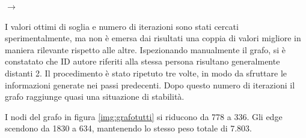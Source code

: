 \documentclass[12pt,a4paper,twoside]{report}
\begin{document}
\begin{center}
\begin{minipage}{0.40\textwidth}
\end{minipage}
\begin{minipage}{0.075\textwidth}
$\rightarrow$
\end{minipage}
\begin{minipage}{0.40\textwidth}
\end{minipage}
\end{center}

I valori ottimi di soglia e numero di iterazioni sono stati cercati sperimentalmente, ma non è
emersa dai risultati una coppia di valori migliore in maniera rilevante rispetto alle altre.
Ispezionando manualmente il grafo, si è constatato che ID autore riferiti alla stessa persona
risultano generalmente distanti 2. Il procedimento è stato ripetuto tre volte, in modo da sfruttare
le informazioni generate nei passi predecenti. Dopo questo numero di iterazioni il grafo raggiunge
quasi una situazione di stabilità.

\clearpage %

I nodi del grafo in figura \ref{img:grafotutti} si riducono da 778 a 336. Gli edge scendono da 1830
a 634, mantenendo lo stesso peso totale di 7.803.
\end{document}
